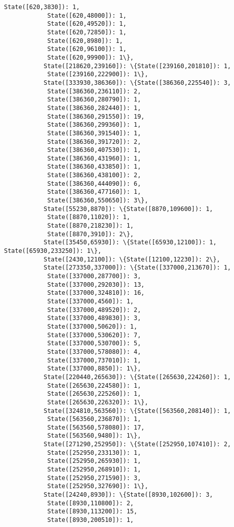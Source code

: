 \documentclass[11pt]{article}
\begin{document}
\begin{Verbatim}[commandchars=\\\{\}]
            State([620,3830]): 1,
            State([620,48000]): 1,
            State([620,49520]): 1,
            State([620,72850]): 1,
            State([620,8980]): 1,
            State([620,96100]): 1,
            State([620,99900]): 1\},
           State([218620,239160]): \{State([239160,201810]): 1,
            State([239160,222900]): 1\},
           State([333930,386360]): \{State([386360,225540]): 3,
            State([386360,236110]): 2,
            State([386360,280790]): 1,
            State([386360,282440]): 1,
            State([386360,291550]): 19,
            State([386360,299360]): 1,
            State([386360,391540]): 1,
            State([386360,391720]): 2,
            State([386360,407530]): 1,
            State([386360,431960]): 1,
            State([386360,433850]): 1,
            State([386360,438100]): 2,
            State([386360,444090]): 6,
            State([386360,477160]): 1,
            State([386360,550650]): 3\},
           State([55230,8870]): \{State([8870,109600]): 1,
            State([8870,11020]): 1,
            State([8870,218230]): 1,
            State([8870,3910]): 2\},
           State([35450,65930]): \{State([65930,12100]): 1, State([65930,233250]): 1\},
           State([2430,12100]): \{State([12100,12230]): 2\},
           State([273350,337000]): \{State([337000,213670]): 1,
            State([337000,287700]): 3,
            State([337000,292030]): 13,
            State([337000,324810]): 16,
            State([337000,4560]): 1,
            State([337000,489520]): 2,
            State([337000,489830]): 3,
            State([337000,50620]): 1,
            State([337000,530620]): 7,
            State([337000,530700]): 5,
            State([337000,578080]): 4,
            State([337000,737010]): 1,
            State([337000,8850]): 1\},
           State([220440,265630]): \{State([265630,224260]): 1,
            State([265630,224580]): 1,
            State([265630,225260]): 1,
            State([265630,226320]): 1\},
           State([324810,563560]): \{State([563560,208140]): 1,
            State([563560,236870]): 1,
            State([563560,578080]): 17,
            State([563560,9480]): 1\},
           State([271290,252950]): \{State([252950,107410]): 2,
            State([252950,233130]): 1,
            State([252950,265930]): 1,
            State([252950,268910]): 1,
            State([252950,271590]): 3,
            State([252950,327690]): 1\},
           State([24240,8930]): \{State([8930,102600]): 3,
            State([8930,110800]): 2,
            State([8930,113200]): 15,
            State([8930,200510]): 1,

\end{Verbatim}
\end{document}
